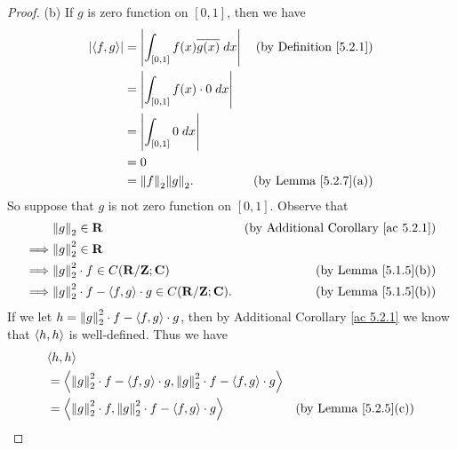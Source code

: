 \begin{proof}{(b)}
    If \(g\) is zero function on \([0, 1]\), then we have
    \begin{align*}
        \abs{\inner*{f, g}} & = \abs{\int_{[0, 1]} f(x) \overline{g(x)} \; dx} & \text{(by Definition \ref{5.2.1})} \\
                            & = \abs{\int_{[0, 1]} f(x) \cdot 0 \; dx}                                              \\
                            & = \abs{\int_{[0, 1]} 0 \; dx}                                                         \\
                            & = 0                                                                                   \\
                            & = \norm*{f}_2 \norm*{g}_2.                       & \text{(by Lemma \ref{5.2.7}(a))}
    \end{align*}
    So suppose that \(g\) is not zero function on \([0, 1]\).
    Observe that
    \begin{align*}
                 & \norm*{g}_2 \in \R                                                 & \text{(by Additional Corollary \ref{ac 5.2.1})} \\
        \implies & \norm*{g}_2^2 \in \R                                                                                                 \\
        \implies & \norm*{g}_2^2 \cdot f \in C(\R / \Z ; \C)                          & \text{(by Lemma \ref{5.1.5}(b))}                \\
        \implies & \norm*{g}_2^2 \cdot f - \inner*{f, g} \cdot g \in C(\R / \Z ; \C). & \text{(by Lemma \ref{5.1.5}(b))}
    \end{align*}
    If we let \(h = \norm*{g}_2^2 \cdot f - \inner*{f, g} \cdot g\), then by Additional Corollary \ref{ac 5.2.1} we know that \(\inner*{h, h}\) is well-defined.
    Thus we have
    \begin{align*}
         & \inner*{h, h}                                                                                                                                                              \\
         & = \inner*{\norm*{g}_2^2 \cdot f - \inner*{f, g} \cdot g, \norm*{g}_2^2 \cdot f - \inner*{f, g} \cdot g}                                                                    \\
         & = \inner*{\norm*{g}_2^2 \cdot f, \norm*{g}_2^2 \cdot f - \inner*{f, g} \cdot g}                                          & \text{(by Lemma \ref{5.2.5}(c))}                \\

\end{align*}
\end{proof}
